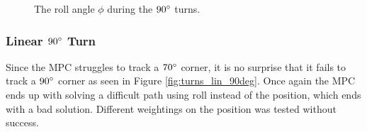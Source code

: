 \begin{figure}
	\caption{The roll angle $\phi$ during the $90\degree$ turns.}
	\label{fig:turns_cur_90deg_roll}
\end{figure}


\subsubsection{Linear $90\degree$ Turn}

Since the MPC struggles to track a $70\degree$ corner, it is no surprise that it fails to track a $90\degree$ corner as seen in Figure \ref{fig:turns_lin_90deg}. Once again the MPC ends up with solving a difficult path using roll instead of the position, which ends with a bad solution. Different weightings on the position was tested without success.

